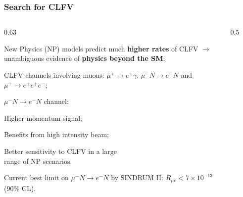 \documentclass{beamer}
\begin{document}
\begin{frame}
    \frametitle{Search for CLFV}
                \vspace{-2mm}
   \begin{columns}
    \begin{column}{0.63\framewidth}
        \setlength{\leftmargini}{1.3em}
        \begin{itemize}
            {\footnotesize    \item New Physics (NP) models predict much \textbf{higher rates} of CLFV $\rightarrow$ unambiguous evidence of \textbf{physics beyond the SM};
            \vspace{4mm}
            \item CLFV channels involving muons: $\mu^+ \rightarrow e^+ \gamma$, $\mu^- N \rightarrow e^- N$ and $\mu^+ \rightarrow e^+ e^+ e^-$;
            \vspace{4mm}
            \item $\mu^- N \rightarrow e^- N$ channel:}
            \vspace{1.5mm}
            \begin{itemize}
                {\footnotesize    \item Higher momentum signal;
                \vspace{1.5mm}
                \item Benefits from high intensity beam;
                \vspace{1.5mm}
                \item Better sensitivity to CLFV in a large \\ range of NP scenarios.}
            \end{itemize}
            \vspace{4mm}
            {\footnotesize    \item Current best limit on $\mu^- N \rightarrow e^- N$ by SINDRUM II: $R_{\mu e} < 7 \times 10^{-13}$ (90\% CL).}
        \end{itemize}
    \end{column}
    \begin{column}{0.5\framewidth}
        \begin{figure}[h]
            \centering
            \hspace*{-3.1ex}

\end{figure}
\end{column}
\end{columns}
\end{frame}
\end{document}
